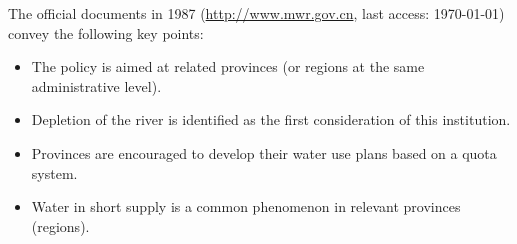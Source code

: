 \documentclass[preprint, 12pt]{elsarticle}
\providecommand{\DIFaddend}{} %
\begin{document}


\DIFaddend The official documents in 1987 (\href{http://www.gov.cn/zhengce/content/2011-03/30/content_3138.htm#}{http://www.mwr.gov.cn}, last access: \today) convey the following key points:

\begin{itemize}
	\item The policy is aimed at related provinces (or regions at the same administrative level).
	\item Depletion of the river is identified as the first consideration of this institution.
	\item Provinces are encouraged to develop their water use plans based on a quota system.
	\item Water in short supply is a common phenomenon in relevant provinces (regions).
\end{itemize}
\end{document}

